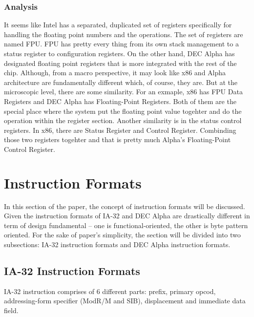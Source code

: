 \documentclass[letterpaper,10pt,titlepage]{article}
\begin{document}
\subsubsection{Analysis}
It seems like Intel has a separated, duplicated set of registers specifically 
for handling the floating point numbers and the operations. The set of 
registers are named FPU. FPU has pretty every thing from its own stack 
management to a status register to configuration registers. On the other hand,
DEC Alpha has designated floating point registers that is more integrated with 
the rest of the chip. Although, from a macro perspective, it may look like 
x86 and Alpha architecture are fundamentally different which, of course, they are.
But at the microscopic level, there are some similarity. For an exmaple, 
x86 has FPU Data Registers and DEC Alpha has Floating-Point Registers. Both
of them are the special place where the system put the floating point value 
togehter and do the operation within the register section. Another similarity 
is in the status control registers. In x86, there are Status Register and 
Control Register. Combinding those two registers togehter and that is pretty much
Alpha's Floating-Point Control Register.




\section{Instruction Formats}
In this section of the paper, the concept of instruction formats  will be
discussed. Given the instruction formats of IA-32 and DEC Alpha are drastically 
different in term of design fundamental -- one is functional-oriented, the other is
byte pattern oriented. For the sake of paper's simplicity, the section will be divided 
into two subsections: IA-32 instruction formats and DEC Alpha instruction formats. 
\subsection{IA-32 Instruction Formats}
IA-32 instruction comprises of 6 different parts: prefix, primary opcod, addressing-form
specifier (ModR/M and SIB), displacement and immediate data field. 

\end{document}

